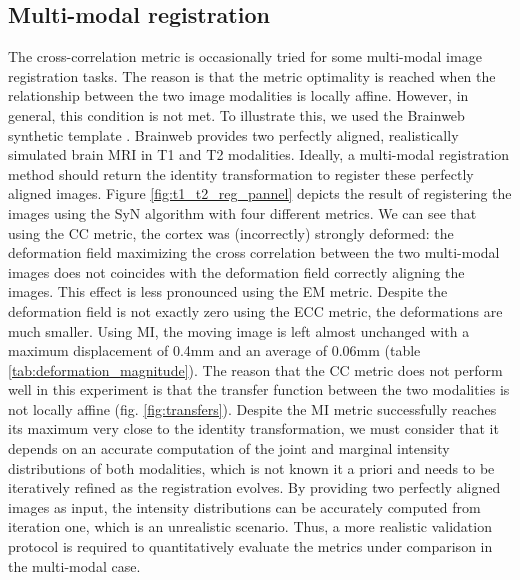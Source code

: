 

\subsection{Multi-modal registration}
The cross-correlation metric is occasionally tried for some multi-modal image registration tasks. The reason is that the
metric optimality is reached when the relationship between the two image modalities is locally affine. However, in general, this condition is not met. To illustrate this,
we used the Brainweb synthetic template \cite{Cocosco1997}\cite{Kwan1999}. Brainweb provides two perfectly aligned, realistically simulated brain MRI in T1 and T2 modalities.
Ideally, a multi-modal registration method should return the identity transformation to register these perfectly aligned images.
Figure \ref{fig:t1_t2_reg_pannel} depicts the result of registering the images using the SyN algorithm with four different metrics. We can see that using the CC metric,
the cortex was (incorrectly) strongly deformed: the deformation field maximizing the cross correlation between the two multi-modal images does not coincides with the deformation field correctly aligning the images. This effect is less pronounced using the EM metric. Despite the deformation field is not exactly zero using the ECC metric, the deformations
are much smaller. Using MI, the moving image is left almost unchanged with a maximum displacement of 0.4mm and an average of 0.06mm (table \ref{tab:deformation_magnitude}). The reason that the CC metric does not perform well in this experiment is that the transfer function between the two modalities is not locally affine (fig. \ref{fig:transfers}). Despite the MI metric successfully reaches its maximum very close to the identity transformation, we must consider that it depends on an accurate computation of the joint and marginal intensity distributions of both modalities, which is not known {it a priori} and needs to be iteratively refined as the registration evolves. By providing two perfectly aligned images as input, the intensity distributions can be accurately computed from iteration one, which is an unrealistic scenario. Thus, a more realistic validation protocol is required to quantitatively evaluate the metrics under comparison in the multi-modal case.

